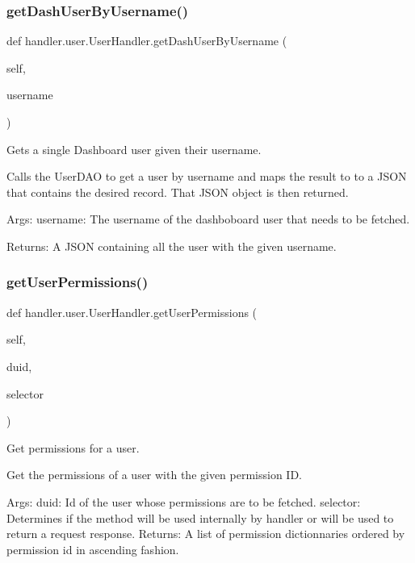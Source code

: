 \subsubsection{\texorpdfstring{get\+Dash\+User\+By\+Username()}{getDashUserByUsername()}}
{\footnotesize\ttfamily def handler.\+user.\+User\+Handler.\+get\+Dash\+User\+By\+Username (\begin{DoxyParamCaption}\item[{}]{self,  }\item[{}]{username }\end{DoxyParamCaption})}

\begin{DoxyVerb}Gets a single Dashboard user given their username.

Calls the UserDAO to get a user by username and maps the result to
to a JSON that contains the desired record. That JSON object 
is then returned.

Args:
    username: The username of the dashboboard user that needs to be fetched.

Returns:
    A JSON containing all the user with the given username.
\end{DoxyVerb}
 \mbox{\label{classhandler_1_1user_1_1_user_handler_aa8e4dd85347c5126bb48383db010fa39}} 
\subsubsection{\texorpdfstring{get\+User\+Permissions()}{getUserPermissions()}}
{\footnotesize\ttfamily def handler.\+user.\+User\+Handler.\+get\+User\+Permissions (\begin{DoxyParamCaption}\item[{}]{self,  }\item[{}]{duid,  }\item[{}]{selector }\end{DoxyParamCaption})}

\begin{DoxyVerb}Get permissions for a user.

Get the permissions of a user with the given permission ID.

Args:
    duid: Id of the user whose permissions are to be fetched.
    selector: Determines if the method will be used internally by handler or will be used to return a request response.
Returns:
    A list of permission dictionnaries ordered by permission id in ascending fashion.
\end{DoxyVerb}
 \mbox{\label{classhandler_1_1user_1_1_user_handler_a83f742752a1b3d3bbf68c3cabc877f3c}} 
